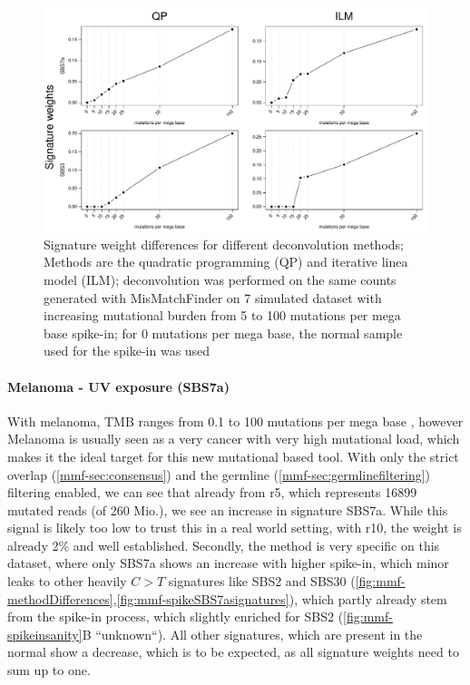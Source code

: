 \begin{figure}[!ht]
\centering
\includegraphics[width=.99\linewidth]{Figures/MisMatchFinder/deconstructionMethodsDifferences.pdf}
\caption[Signature weight differences for different deconvolution methods]{Signature weight differences for different deconvolution methods; Methods are the quadratic programming (QP) and iterative linea model (ILM); deconvolution was performed on the same counts generated with MisMatchFinder on 7 simulated dataset with increasing mutational burden from 5 to 100 mutations per mega base spike-in; for 0 mutations per mega base, the normal sample used for the spike-in was used}\label{fig:mmf-methodDifferences}
\end{figure}


\paragraph{Melanoma - UV exposure (SBS7a)}
\label{mmf-sec:melaSim}

With melanoma, TMB ranges from 0.1 to 100 mutations per mega base \cite{Alexandrov2020}, however Melanoma is usually seen as a very cancer with very high mutational load, which makes it the ideal target for this new mutational based tool. With only the strict overlap (\autoref{mmf-sec:consensus}) and the germline (\autoref{mmf-sec:germlinefiltering}) filtering enabled, we can see that already from r5, which represents 16899 mutated reads (of 260 Mio.), we see an increase in signature SBS7a. While this signal is likely too low to trust this in a real world setting, with r10, the weight is already 2\% and well established. Secondly, the method is very specific on this dataset, where only SBS7a shows an increase with higher spike-in, which minor leaks to other heavily $C>T$ signatures like SBS2 and SBS30 (\autoref{fig:mmf-methodDifferences},\autoref{fig:mmf-spikeSBS7asignatures}), which partly already stem from the spike-in process, which slightly enriched for SBS2 (\autoref{fig:mmf-spikeinsanity}B ``unknown``). All other signatures, which are present in the normal show a decrease, which is to be expected, as all signature weights need to sum up to one.


